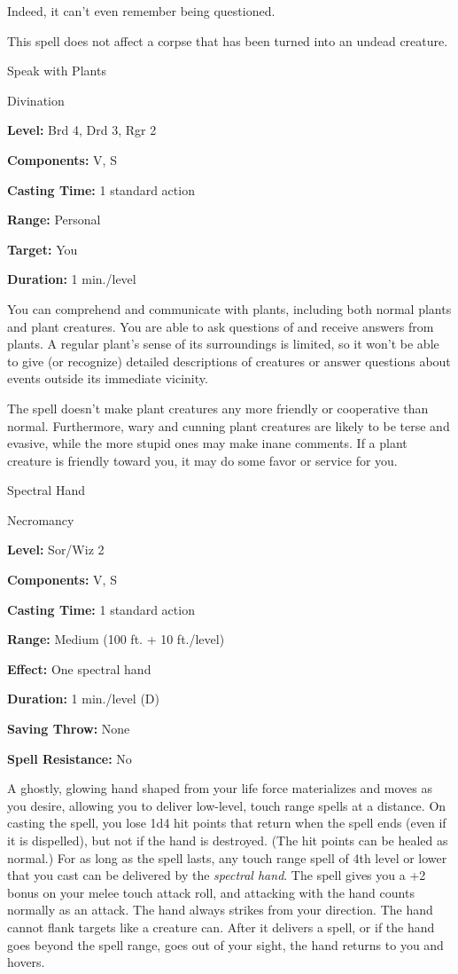 \documentclass{article}
\begin{document}
Indeed, it can't even remember being questioned.

This spell does not affect a corpse that has been turned into an undead creature.

\vspace{12pt}
Speak with Plants

Divination

\textbf{Level:} Brd 4, Drd 3, Rgr 2

\textbf{Components:} V, S

\textbf{Casting Time:} 1 standard action

\textbf{Range:} Personal

\textbf{Target:} You

\textbf{Duration:} 1 min./level

You can comprehend and communicate with plants, including both normal plants and 
plant creatures. You are able to ask questions of and receive answers from plants. 
A regular plant's sense of its surroundings is limited, so it won't be able to 
give (or recognize) detailed descriptions of creatures or answer questions about 
events outside its immediate vicinity.

The spell doesn't make plant creatures any more friendly or cooperative than normal. 
Furthermore, wary and cunning plant creatures are likely to be terse and evasive, 
while the more stupid ones may make inane comments. If a plant creature is friendly 
toward you, it may do some favor or service for you.

\vspace{12pt}
Spectral Hand

Necromancy

\textbf{Level:} Sor/Wiz 2

\textbf{Components:} V, S

\textbf{Casting Time:} 1 standard action

\textbf{Range: }Medium (100 ft. + 10 ft./level)

\textbf{Effect:} One spectral hand

\textbf{Duration:} 1 min./level (D)

\textbf{Saving Throw:} None

\textbf{Spell Resistance:} No

A ghostly, glowing hand shaped from your life force materializes and moves as you 
desire, allowing you to deliver low-level, touch range spells at a distance. On 
casting the spell, you lose 1d4 hit points that return when the spell ends (even 
if it is dispelled), but not if the hand is destroyed. (The hit points can be healed 
as normal.) For as long as the spell lasts, any touch range spell of 4th level 
or lower that you cast can be delivered by the \textit{spectral hand}. The spell 
gives you a +2 bonus on your melee touch attack roll, and attacking with the hand 
counts normally as an attack. The hand always strikes from your direction. The 
hand cannot flank targets like a creature can. After it delivers a spell, or if 
the hand goes beyond the spell range, goes out of your sight, the hand returns 
to you and hovers.
\end{document}
